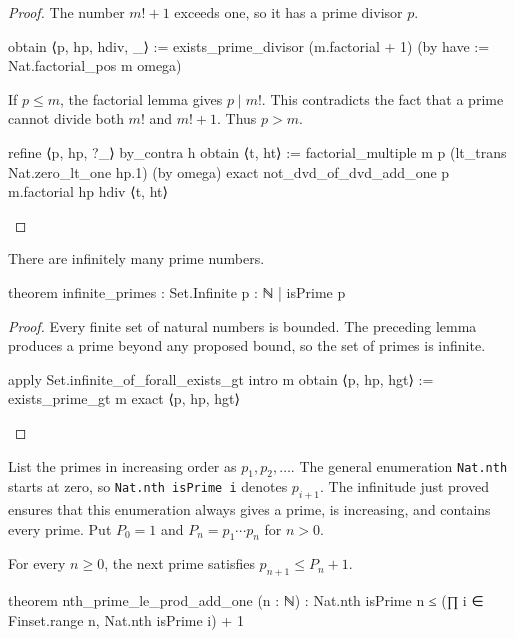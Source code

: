 \begin{proof}
  The number $m!
    +1$ exceeds one, so it has a prime divisor $p$.

  \begin{lean}
    obtain ⟨p, hp, hdiv, _⟩ :=
      exists_prime_divisor (m.factorial + 1) (by
        have := Nat.factorial_pos m
        omega)
  \end{lean}

  If $p\le m$, the factorial lemma gives $p\mid m!
  $.
  This contradicts the fact that a prime cannot divide both $m!
  $ and $m!+1$.
  Thus $p>m$.

  \begin{lean}
    refine ⟨p, hp, ?_⟩
    by_contra h
    obtain ⟨t, ht⟩ := factorial_multiple m p (lt_trans Nat.zero_lt_one hp.1) (by omega)
    exact not_dvd_of_dvd_add_one p m.factorial hp hdiv ⟨t, ht⟩
  \end{lean}

\end{proof}

\begin{theorem}
  \label{ent:thm:infinitely-many-primes}
  There are infinitely many prime numbers.

  \begin{lean}
    theorem infinite_primes : Set.Infinite {p : ℕ | isPrime p}
  \end{lean}
\end{theorem}

\begin{proof}
  Every finite set of natural numbers is bounded.
  The preceding lemma produces a prime beyond any proposed bound, so the set of primes is infinite.

  \begin{lean}
    apply Set.infinite_of_forall_exists_gt
    intro m
    obtain ⟨p, hp, hgt⟩ := exists_prime_gt m
    exact ⟨p, hp, hgt⟩
  \end{lean}

\end{proof}

List the primes in increasing order as $p_1,p_2,\ldots$.
The general enumeration \texttt{Nat.nth} starts at zero, so \texttt{Nat.nth isPrime i} denotes
$p_{i+1}$.
The infinitude just proved ensures that this enumeration always gives a prime, is increasing, and
contains every prime.
Put $P_0=1$ and $P_n=p_1\cdots p_n$ for $n>0$.

\begin{lemma}
  \label{ent:lem:next-prime-product-bound}
  For every $n\ge0$, the next prime satisfies $p_{n+1}\le P_n+1$.

  \begin{lean}
    theorem nth_prime_le_prod_add_one (n : ℕ) :
        Nat.nth isPrime n ≤ (∏ i ∈ Finset.range n, Nat.nth isPrime i) + 1
  \end{lean}
\end{lemma}

